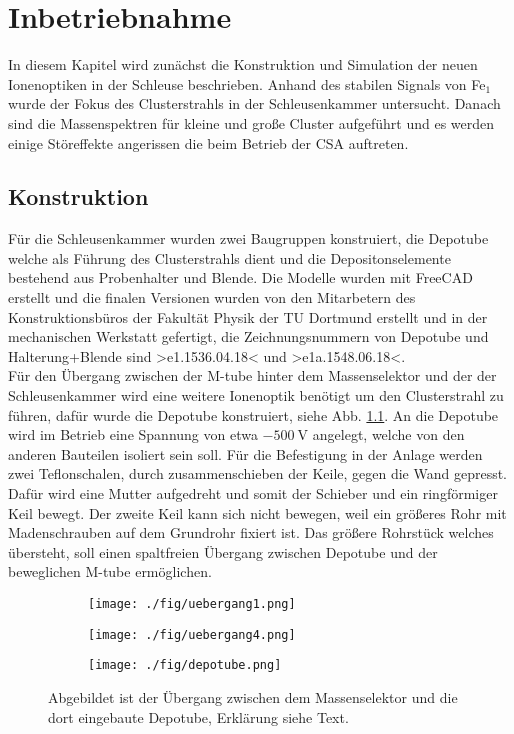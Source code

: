 \chapter{Inbetriebnahme}
\label{sec:inbetriebnahme}
In diesem Kapitel wird zunächst die Konstruktion und Simulation der neuen Ionenoptiken in der Schleuse beschrieben.
Anhand des stabilen Signals von Fe$_1$ wurde der Fokus des Clusterstrahls in der Schleusenkammer untersucht.
Danach sind die Massenspektren für kleine und große Cluster aufgeführt und es werden einige Störeffekte angerissen die beim Betrieb der CSA auftreten.
\section{Konstruktion}
Für die Schleusenkammer wurden zwei Baugruppen konstruiert, die Depotube welche als Führung des Clusterstrahls dient und die Depositonselemente bestehend aus Probenhalter und Blende. Die Modelle wurden mit FreeCAD\cite{freecad} erstellt und die finalen Versionen wurden von den Mitarbetern des Konstruktionsbüros der Fakultät Physik der TU Dortmund erstellt \cite{konstruktion} und in der mechanischen Werkstatt gefertigt, die Zeichnungsnummern von Depotube und Halterung+Blende sind >e1.1536.04.18< und >e1a.1548.06.18<.\\

Für den Übergang zwischen der M-tube hinter dem Massenselektor und der der Schleusenkammer wird eine weitere Ionenoptik benötigt um den Clusterstrahl zu führen, dafür wurde die Depotube konstruiert, siehe Abb. \ref{fig:depotube}.
An die Depotube wird im Betrieb eine Spannung von etwa $\SI{-500}{\volt}$ angelegt, welche von den anderen Bauteilen isoliert sein soll.
Für die Befestigung in der Anlage werden zwei Teflonschalen, durch zusammenschieben der Keile, gegen die Wand gepresst.
Dafür wird eine Mutter aufgedreht und somit der Schieber und ein ringförmiger Keil bewegt.
Der zweite Keil kann sich nicht bewegen, weil ein größeres Rohr mit Madenschrauben auf dem Grundrohr fixiert ist.
Das größere Rohrstück welches übersteht, soll einen spaltfreien Übergang zwischen Depotube und der beweglichen M-tube ermöglichen.

\begin{figure}
  \begin{subfigure}[h]{1\textwidth}
    \texttt{[image: ./fig/uebergang1.png]}
  \end{subfigure}\hfill
  \begin{subfigure}[h]{1\textwidth}
    \texttt{[image: ./fig/uebergang4.png]}
  \end{subfigure}\hfill
  \begin{subfigure}[h]{1\textwidth}
    \texttt{[image: ./fig/depotube.png]}
  \end{subfigure}
  \caption{Abgebildet ist der Übergang zwischen dem Massenselektor und die dort eingebaute Depotube, Erklärung siehe Text.}
  \label{fig:depotube}
\end{figure}

